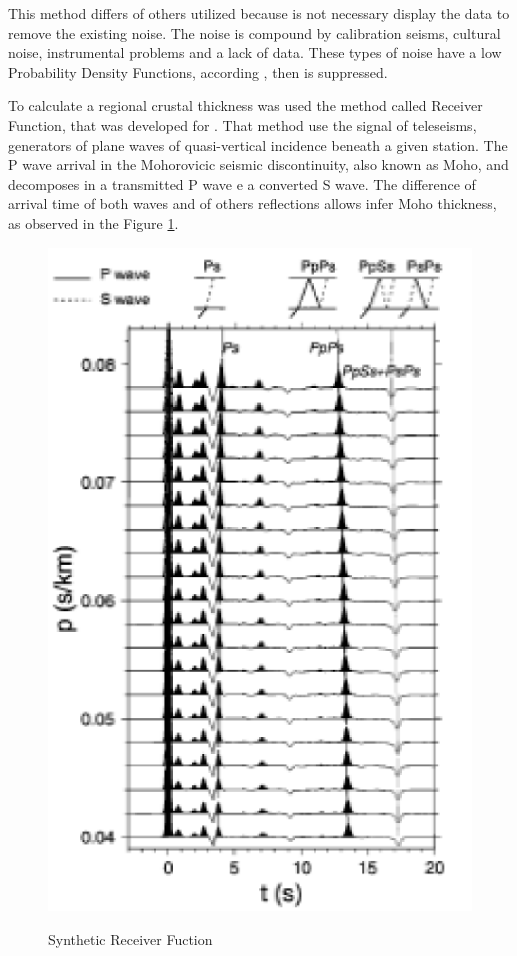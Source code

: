 \documentclass[twoside,letterpaper,twocolumn]{article}
\begin{document}
This method differs of others utilized because is not necessary display the data to remove the existing noise. The noise is compound by calibration seisms, cultural noise, instrumental problems and a lack of data. These types of noise have a low Probability Density Functions, according \cite{mcnamara_ambient_2004}, then is suppressed.

To calculate a regional crustal thickness was used the method called Receiver Function, that was developed for \cite{langston_effect_1977}. That method use the signal of teleseisms, generators of plane waves of quasi-vertical incidence beneath a given station. The P wave arrival in the Mohorovicic seismic discontinuity, also known as Moho, and decomposes in a transmitted P wave e a converted S wave. The difference of arrival time of both waves and of others reflections allows infer Moho thickness, as observed in the Figure \ref{figura2}.

\begin{figure}[!ht]
\centering
\includegraphics[scale=1.3]{funcoes_do_receptor.png} \caption{Synthetic Receiver Fuction} \citep{zhu_moho_2000}
\label{figura2}
\end{figure}
 
\end{document}
